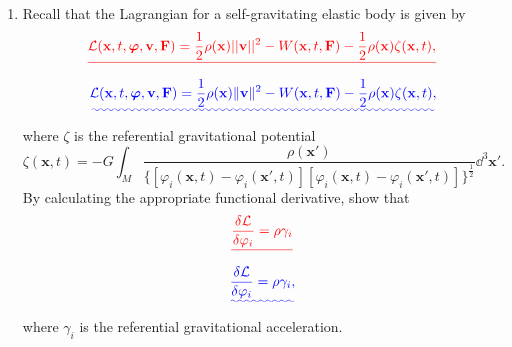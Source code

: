 \documentclass[a4paper,10pt]{paper}
\providecommand{\DIFadd}[1]{{\protect\color{blue}\uwave{#1}}} %
\providecommand{\DIFdel}[1]{{\protect\color{red}\sout{#1}}}                      %
\providecommand{\DIFaddbegin}{} %
\providecommand{\DIFaddend}{} %
\providecommand{\DIFdelbegin}{} %
\providecommand{\DIFdelend}{} %
\begin{document}
\begin{enumerate}
\item Recall that the Lagrangian for a self-gravitating elastic body is given by
\DIFdelbegin \begin{displaymath}
    \DIFdel{\mathcal{L}(\mathbf{x},t,\boldsymbol{\varphi},\mathbf{v},\mathbf{F})=\frac{1}{2}\rho(\mathbf{x})||\mathbf{v}||^{2}-W(\mathbf{x},t,\mathbf{F})-\frac{1}{2}\rho(\mathbf{x})\zeta(\mathbf{x},t),
}\end{displaymath}%
\DIFdelend \DIFaddbegin \begin{equation*}
    \DIFadd{\mathcal{L}(\mathbf{x},t,\bphi,\mathbf{v},\mathbf{F})=\frac{1}{2}\rho(\mathbf{x})\|\mathbf{v}\|^{2}-W(\mathbf{x},t,\mathbf{F})-\frac{1}{2}\rho(\mathbf{x})\zeta(\mathbf{x},t),
}\end{equation*}\DIFaddend 
where $\zeta$ is the referential gravitational potential
\begin{equation*}
    \zeta(\mathbf{x},t)=-G\int_{M}\frac{\rho(\mathbf{x}')}{\{[\varphi_{i}(\mathbf{x},t)-\varphi_{i}(\mathbf{x}',t)][\varphi_{i}(\mathbf{x},t)-\varphi_{i}(\mathbf{x}',t)]\}^{\frac{1}{2}}}\dd^{3}\mathbf{x}'.
\end{equation*}
By calculating the appropriate functional derivative, show that
\DIFdelbegin \begin{displaymath}
    \DIFdel{\frac{\delta\mathcal{L}}{\delta\varphi_{i}}=\rho\gamma_{i}
}\end{displaymath}%
\DIFdelend \DIFaddbegin \begin{equation*}
    \DIFadd{\frac{\delta\mathcal{L}}{\delta\varphi_{i}}=\rho\gamma_{i},
}\end{equation*}\DIFaddend 
where $\gamma_{i}$ is the referential gravitational acceleration.


\end{enumerate}
\end{document}
